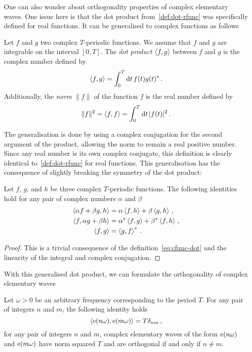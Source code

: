 One can also wonder about orthogonality properties of complex elementary waves. One issue here is that the dot product from~\cref{def:dot-rfunc} was specifically defined for real functions. It can be generalised to complex functions as follows
\begin{definition}
  Let $f$ and $g$ two complex $T$-periodic functions. We assume that $f$ and $g$ are integrable on the
  interval $[0,T]$. The \emph{dot product} $\braket{f,g}$ between $f$ and $g$ is the complex number defined by
  \begin{equation}
    \braket{f,g}=\int_{0}^{T}\mathrm{d} t\, f(t)g(t)^*\,.\label{eq:cfunc-dot}
  \end{equation}
  Additionally, the \emph{norm} $\|f\|$ of the function $f$ is the real number defined by
  \begin{equation}
    \|f\|^2=\braket{f,f}=\int_{0}^{T}\mathrm{d} t\, |f(t)|^2\,.
  \end{equation}
\end{definition}
The generalisation is done by using a complex conjugation for the second argument of the product, allowing the norm to remain a real positive number. Since any real number is its own complex conjugate, this definition is clearly identical to~\cref{def:dot-rfunc} for real functions. This generalisation has the consequence of slightly breaking the symmetry of the dot product:
\begin{proposition}
  Let $f$, $g$, and $h$ be three complex $T$-periodic functions. The following identities hold for any pair of complex numbers $\alpha$ and $\beta$
  \begin{align}
    \braket{\alpha f+\beta g,h}&=\alpha\braket{f,h}+\beta\braket{g,h}\,,\\
    \braket{f,\alpha g+\beta h}&=\alpha^*\braket{f,g}+\beta^*\braket{f,h}\,,\\
    \braket{f,g}&=\braket{g,f}^*\,.
  \end{align}
\end{proposition}
\begin{proof}
  This is a trivial consequence of the definition~\cref{eq:cfunc-dot} and the linearity of the integral and complex conjugation.
\end{proof}
With this generalised dot product, we can formulate the orthogonality of complex elementary waves
\begin{theorem}
  Let $\omega>0$ be an arbitrary frequency corresponding to the period $T$.
  For any pair of integers $n$ and $m$, the following identity holds
  \begin{equation}
    \braket{\mathrm{e}(n\omega),\mathrm{e}(m\omega)}=T\delta_{nm}\,,
  \end{equation}
  \ie for any pair of integers $n$ and $m$, complex elementary waves of the form $\mathrm{e}(n\omega)$ and $\mathrm{e}(m\omega)$ have norm squared $T$ and are orthogonal if and only if $n\neq m$.
\end{theorem}
